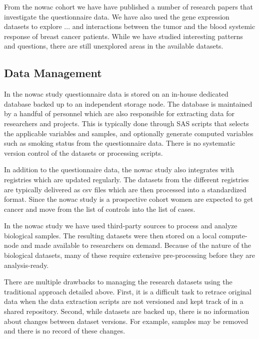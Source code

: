 From the \gls{nowac} cohort we have have published a number of research papers
that investigate the questionnaire data\cite{find-some-papers}. We have also
used the gene expression datasets to explore ... and interactions between the
tumor and the blood systemic response of breast cancer
patients.\cite{dumeaux2017interactions} While we have studied interesting
patterns and questions, there are still unexplored areas in the available
datasets.

\subsection{Data Management} 
In the \gls{nowac} study questionnaire data is stored on an in-house dedicated
database backed up to an independent storage node. The database is maintained by
a handful of personnel which are also responsible for extracting data for
researchers and projects. This is typically done through SAS scripts that
selects the applicable variables and samples, and optionally generate computed
variables such as smoking status from the questionnaire data. There is no
systematic version control of the datasets or processing scripts. 

In addition to the questionnaire data, the \gls{nowac} study also integrates
with registries which are updated regularly. The datasets from the different
registries are typically delivered as \gls{csv} files which are then processed
into a standardized format. Since the \gls{nowac} study is a prospective cohort
women are expected to get cancer and move from the list of controls into the
list of cases. 

In the \gls{nowac} study we have used third-party sources to process and analyze
biological samples. The resulting datasets were then stored on a local
compute-node and made available to researchers on demand. Because of the nature
of the biological datasets, many of these require extensive pre-processing
before they are analysis-ready. 

There are multiple drawbacks to managing the research datasets using the
traditional approach detailed above. First, it is a difficult task to retrace
original data when the data extraction scripts are not versioned and kept track
of in a shared repository. Second, while datasets are backed up, there is no
information about changes between dataset versions. For example, samples may be
removed and there is no record of these changes. 

